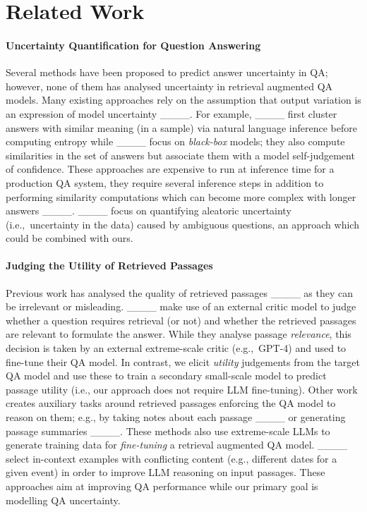 \section{Related Work}
\paragraph{Uncertainty Quantification for Question Answering}
 Several methods have been proposed to predict answer uncertainty in
 QA; however, none of them has analysed uncertainty in retrieval
 augmented QA models.  Many existing approaches rely on the assumption
 that output variation is an expression of model uncertainty
 ____. For
 example, ____ first cluster answers with similar
 meaning (in a sample) via natural language inference before computing
 entropy while ____ focus on
 \emph{black-box} models; they also compute similarities in the set of
 answers but associate them with a model self-judgement of
 confidence. These approaches are expensive to run at inference time
 for a production QA system, they require several inference steps in
 addition to performing similarity computations which can become more
 complex with longer answers ____.
 ____ focus on quantifying aleatoric uncertainty
 (i.e.,~uncertainty in the data) caused by ambiguous questions, an
 approach which could be combined with ours.


\paragraph{Judging the Utility of Retrieved Passages}

Previous work has analysed the quality of retrieved passages
____
as they can be irrelevant or misleading.  ____ make
use of an external critic model to judge whether a question requires
retrieval (or not) and whether the retrieved passages are relevant to
formulate the answer.  While they analyse passage \emph{relevance},
this decision is taken by an external extreme-scale critic
(e.g.,~GPT-4) and used to fine-tune their QA model. In contrast, we
elicit \emph{utility} judgements from the target QA model and use
these to train a secondary small-scale model to predict passage
utility (i.e., our approach does not require LLM fine-tuning). Other
work creates auxiliary tasks around retrieved passages enforcing the
QA model to reason on them; e.g., by taking notes about each passage
____ or generating passage summaries
____. These methods also use extreme-scale LLMs to
generate training data for \emph{fine-tuning} a retrieval augmented QA
model. ____ select in-context examples
with conflicting content (e.g., different dates for a given event) in
order to improve LLM reasoning on input passages.  These approaches
aim at improving QA performance while our primary goal is modelling QA
uncertainty.

